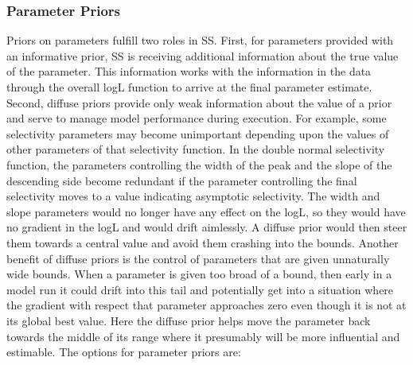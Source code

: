 \subsubsection{Parameter Priors}
Priors on parameters fulfill two roles in SS.  First, for parameters provided with an informative prior, SS is receiving additional information about the true value of the parameter.  This information works with the information in the data through the overall logL function to arrive at the final parameter estimate.  Second, diffuse priors provide only weak information about the value of a prior and serve to manage model performance during execution.  For example, some selectivity parameters may become unimportant depending upon the values of other parameters of that selectivity function.  In the double normal selectivity function, the parameters controlling the width of the peak and the slope of the descending side become redundant if the parameter controlling the final selectivity moves to a value indicating asymptotic selectivity.  The width and slope parameters would no longer have any effect on the logL, so they would have no gradient in the logL and would drift aimlessly.  A diffuse prior would then steer them towards a central value and avoid them crashing into the bounds.  Another benefit of diffuse priors is the control of parameters that are given unnaturally wide bounds.  When a parameter is given too broad of a bound, then early in a model run it could drift into this tail and potentially get into a situation where the gradient with respect that parameter approaches zero even though it is not at its global best value.  Here the diffuse prior helps move the parameter back towards the middle of its range where it presumably will be more influential and estimable.  The options for parameter priors are:
